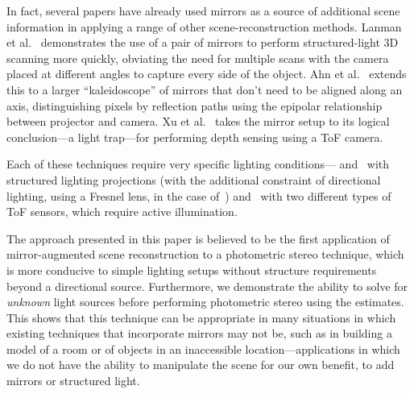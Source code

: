 In fact, several papers have already used mirrors as a source of additional
scene information in applying a range of other scene-reconstruction methods.
Lanman et al.~\cite{lanman} demonstrates the use of a pair of mirrors to
perform structured-light 3D scanning more quickly, obviating the need for
multiple scans with the camera placed at different angles to capture every side
of the object. Ahn et al.~\cite{ahn} extends this to a larger ``kaleidoscope''
of mirrors that don't need to be aligned along an axis, distinguishing pixels
by reflection paths using the epipolar relationship between projector and
camera. Xu et al.~\cite{xu} takes the mirror setup to its logical
conclusion---a light trap---for performing depth sensing using a ToF camera.

Each of these techniques require very specific lighting
conditions---\cite{lanman} and~\cite{ahn} with structured lighting projections
(with the additional constraint of directional lighting, using a Fresnel lens,
in the case of~\cite{lanman}) and~\cite{xu} with two different types of ToF
sensors, which require active illumination.

The approach presented in this paper is believed to be the first application of
mirror-augmented scene reconstruction to a photometric stereo technique, which
is more conducive to simple lighting setups without structure requirements
beyond a directional source. Furthermore, we demonstrate the ability to solve
for \textit{unknown} light sources before performing photometric stereo using
the estimates. This shows that this technique can be appropriate in many
situations in which existing techniques that incorporate mirrors may not be,
such as in building a model of a room or of objects in an inaccessible
location---applications in which we do not have the ability to manipulate the
scene for our own benefit, to add mirrors or structured light.

